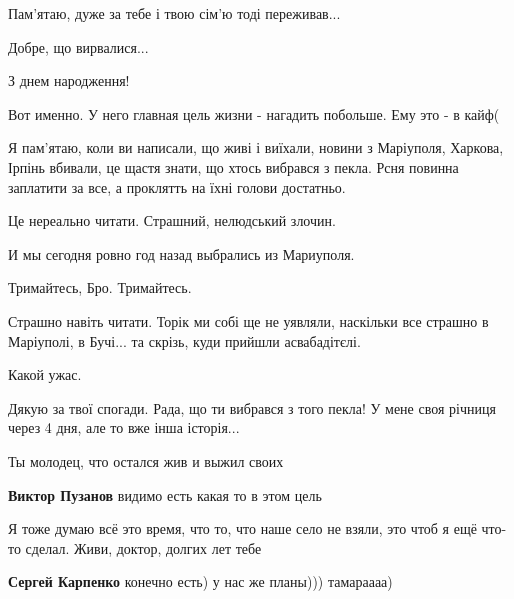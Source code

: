 
Пам'ятаю, дуже за тебе і твою сім'ю тоді переживав...

Добре, що вирвалися...


З днем народження!


Вот именно. У него главная цель жизни - нагадить побольше. Ему это - в кайф(


Я пам'ятаю, коли ви написали, що живі і виїхали, новини з Маріуполя, Харкова,
Ірпінь вбивали, це щастя знати, що хтось вибрався з пекла. Рсня повинна
заплатити за все, а проклятть на їхні голови достатньо.


Це нереально читати. Страшний, нелюдський злочин.


И мы сегодня ровно год назад выбрались из Мариуполя.


Тримайтесь, Бро. Тримайтесь.


Страшно навіть читати. Торік ми собі ще не уявляли, наскільки все страшно в
Маріуполі, в Бучі... та скрізь, куди прийшли асвабадітєлі.


Какой ужас.


Дякую за твої спогади. Рада, що ти вибрався з того пекла! У мене своя річниця
через 4 дня, але то вже інша історія...


Ты молодец, что остался жив и выжил своих

\begin{itemize} %
\textbf{Виктор Пузанов} видимо есть какая то в этом цель


Я тоже думаю всё это время, что то, что наше село не взяли, это чтоб я ещё
что-то сделал. Живи, доктор, долгих лет тебе

\textbf{Сергей Карпенко} конечно есть) у нас же планы))) тамараааа)

\end{itemize} %

